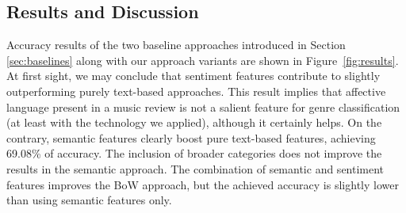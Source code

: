 

\subsection{Results and Discussion}

Accuracy results of the two baseline approaches introduced in Section \ref{sec:baselines} along with our approach variants are shown in Figure~\ref{fig:results}. At first sight, we may conclude that sentiment features contribute to slightly outperforming purely text-based approaches. This result implies that affective language present in a music review is not a salient feature for genre classification (at least with the technology we applied), although it certainly helps. On the contrary, semantic features clearly boost pure text-based features, achieving 69.08\% of accuracy. The inclusion of broader categories does not improve the results in the semantic approach. The combination of semantic and sentiment features improves the BoW approach, but the achieved accuracy is slightly lower than using semantic features only.%

